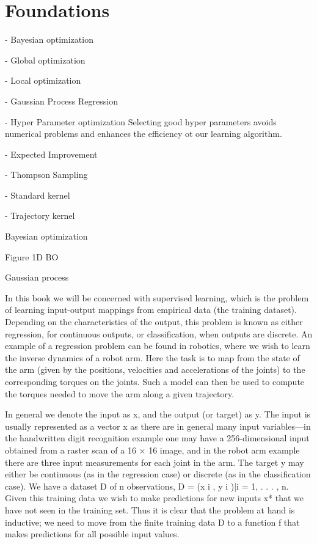 \chapter{Foundations}
\label{chap:2}
%

- Bayesian optimization

- Global optimization

- Local optimization

- Gaussian Process Regression

- Hyper Parameter optimization
Selecting good hyper parameters avoids numerical problems and enhances the efficiency ot our learning algorithm.

- Expected Improvement

- Thompson Sampling

- Standard kernel

- Trajectory kernel

Bayesian optimization



Figure 1D BO


Gaussian process

In this book we will be concerned with supervised learning, which is the problem of learning input-output mappings from empirical data (the training dataset). Depending on the characteristics of the output, this problem is known as either regression, for continuous outputs, or classification, when outputs are discrete. An example of a regression problem can be found in robotics, where we wish to learn the inverse dynamics of a robot arm. Here the task is to map from the state of the arm (given by the positions, velocities and accelerations of the joints) to the corresponding torques on the joints. Such a model can then be used to compute the torques needed to move the arm along a given trajectory.

In general we denote the input as x, and the output (or target) as y. The input is usually represented as a vector x as there are in general many input variables—in the handwritten digit recognition example one may have a 256-dimensional input obtained from a raster scan of a 16 × 16 image, and in the robot arm example there are three input measurements for each joint in the arm. The target y may either be continuous (as in the regression case) or discrete (as in the classification case). We have a dataset D of n observations, D = {(x i , y i )|i = 1, . . . , n}. Given this training data we wish to make predictions for new inputs x* that we have not seen in the training set. Thus it is clear that the problem at hand is inductive; we need to move from the finite training data D to a function f that makes predictions for all possible input values.




